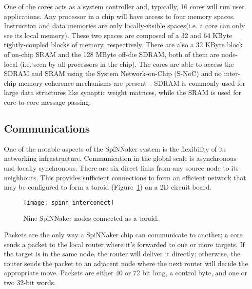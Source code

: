 One of the cores acts as a system controller and, typically, 16 cores will run user applications. Any processor in a chip will have access to four memory spaces. Instruction and data memories are only locally-visible spaces(i.e. a core can only see its local memory). These two spaces are composed of a 32 and 64 KByte tightly-coupled blocks of memory, respectively. There are also a 32 KByte block of on-chip SRAM and the 128 MByte off-die SDRAM, both of them are node-local (i.e. seen by all processors in the chip). The cores are able to access the SDRAM and SRAM using the System Network-on-Chip (S-NoC) and no inter-chip memory coherence mechanisms are present~\cite{furber2013overview}. SDRAM is commonly used for large data structures like synaptic weight matrices, while the SRAM is used for core-to-core message passing.

\subsection{Communications}

One of the notable aspects of the SpiNNaker system is the flexibility of its networking infrastructure. Communication in the global scale is asynchronous and locally synchronous. There are six direct links from any source node to its neighbours. This provides sufficient connections to form an efficient network that may be configured to form a toroid (Figure~\ref{fig:hw:spinn-toroid}) on a 2D circuit board.

\begin{figure}[h]
  \begin{center}
    \texttt{[image: spinn-interconect]}
    \caption{Nine SpiNNaker nodes connected as a toroid.}
    \label{fig:hw:spinn-toroid}
  \end{center}
\end{figure}

Packets are the only way a SpiNNaker chip can communicate to another; a core sends a packet to the local router where it's forwarded to one or more targets. If the target is in the same node, the router will deliver it directly; otherwise, the router sends the packet to an adjacent node where the next router will decide the appropriate move. Packets are either 40 or 72 bit long, a control byte, and one or two 32-bit words.

